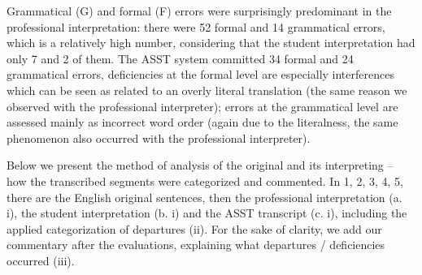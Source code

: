 \documentclass[output=paper]{langscibook}
\begin{document}
Grammatical (G) and formal (F) errors were surprisingly predominant in the professional interpretation: there were 52 formal and 14 grammatical errors, which is a relatively high number, considering that the student interpretation had only 7 and 2 of them. The ASST system committed 34 formal and 24 grammatical errors, deficiencies at the formal level are especially interferences which can be seen as related to an overly literal translation (the same reason we observed with the professional interpreter); errors at the grammatical level are assessed mainly as incorrect word order (again due to the literalness, the same phenomenon also occurred with the professional interpreter).

Below we present the method of analysis of the original and its interpreting – how the transcribed segments were categorized and commented. In 1, 2, 3, 4, 5, there are the English original sentences, then the professional interpretation (a. i), the student interpretation (b. i) and the ASST transcript (c. i), including the applied categorization of departures (ii). For the sake of clarity, we add our commentary after the evaluations, explaining what departures / deficiencies occurred (iii). 

\end{document}
